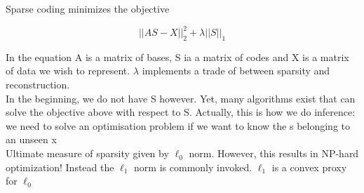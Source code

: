 Sparse coding minimizes the objective

\[
    ||AS - X||^2_2 + \lambda ||S||_1
\]

In the equation A is a matrix of bases, S ia a matrix of codes and X is a matrix of data we wish to represent. $\lambda$ implements a trade of between sparsity and reconstruction.\\

In the beginning, we do not have S however. Yet, many algorithms exist that can solve the objective above with respect to S. Actually, this is how we do inference: we need to solve an optimisation problem if we want to know the s belonging to an unseen  x \\


Ultimate measure of sparsity given by $\ell_0$ norm. However, this results in NP-hard optimization! Instead the $\ell_1$ norm is commonly invoked. $\ell_1$ is a convex proxy for $\ell_0$

